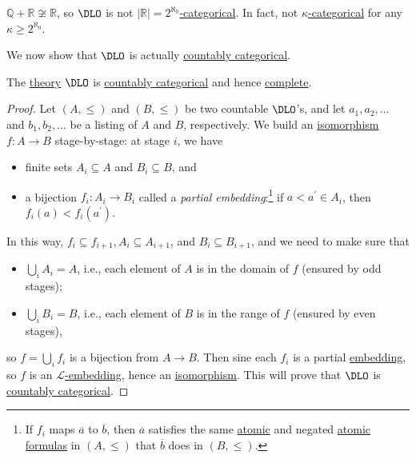 \begin{eg}
	\(\mathbb{Q} + \mathbb{R} \not \cong \mathbb{R} \), so \(\DLO\) is not \hyperref[def:categorical]{\(\vert \mathbb{R} \vert = 2^{\aleph_0}\)-categorical}. In fact, not \hyperref[def:categorical]{\(\kappa \)-categorical} for any \(\kappa \geq 2^{\aleph_0}\).
\end{eg}

We now show that \(\DLO\) is actually \hyperref[def:countably-categorical]{countably categorical}.

\begin{theorem}\label{thm:DLO-countably-categorical}
	The \hyperref[def:theory]{theory} \(\DLO\) is \hyperref[def:countably-categorical]{countably categorical} and hence \hyperref[def:theory-complete]{complete}.
\end{theorem}
\begin{proof}
	Let \((A, \leq )\) and \((B, \leq )\) be two countable \(\DLO\)'s, and let \(a_1, a_2, \dots \) and \(b_1, b_2, \dots \) be a listing of \(A\) and \(B\), respectively. We build an \hyperref[def:isomorphism]{isomorphism} \(f\colon A \to B\) stage-by-stage: at stage \(i\), we have
	\begin{itemize}
		\item finite sets \(A_i \subseteq A\) and \(B_i \subseteq B\), and
		\item a bijection \(f_i \colon A_i \to B_i\) called a \emph{partial embedding}:\footnote{If \(f_i\) maps \(\overline{a} \) to \(\overline{b} \), then \(\overline{a} \) satisfies the same \hyperref[not:atomic]{atomic} and negated \hyperref[not:atomic]{atomic} \hyperref[def:formula]{formulas} in \((A, \leq )\) that \(\overline{b} \) does in \((B, \leq )\).} if \(a < a^\prime \in A_i\), then \(f_i(a) < f_i(a^\prime )\).
	\end{itemize}
	In this way, \(f_i \subseteq f_{i+1} , A_i \subseteq A_{i+1} \), and \(B_i \subseteq B_{i+1} \), and we need to make sure that
	\begin{itemize}
		\item \(\bigcup_{i} A_i = A\), i.e., each element of \(A\) is in the domain of \(f\) (ensured by odd stages);
		\item \(\bigcup_{i} B_i = B\), i.e., each element of \(B\) is in the range of \(f\) (ensured by even stages),
	\end{itemize}
	so \(f = \bigcup_{i} f_i\) is a bijection from \(A \to B\). Then sine each \(f_i\) is a partial \hyperref[def:embedding]{embedding}, so \(f\) is an \hyperref[def:embedding]{\(\mathcal{L} \)-embedding}, hence an \hyperref[def:isomorphism]{isomorphism}. This will prove that \(\DLO\) is \hyperref[def:countably-categorical]{countably categorical}.


\end{proof}
